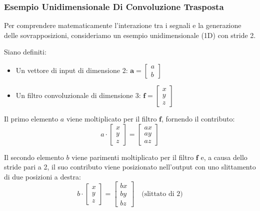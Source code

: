﻿\documentclass[11pt, a4paper]{article}
\begin{document}
\newpage

\subsubsection{Esempio Unidimensionale Di Convoluzione Trasposta}

Per comprendere matematicamente l'interazione tra i segnali e la generazione delle sovrapposizioni, consideriamo un esempio unidimensionale (1D) con stride 2.

Siano definiti:
\begin{itemize}[noitemsep]
    \item Un vettore di input di dimensione 2: $\bm{a} = \begin{bmatrix} a \\ b \end{bmatrix}$
    \item Un filtro convoluzionale di dimensione 3: $\bm{f} = \begin{bmatrix} x \\ y \\ z \end{bmatrix}$
\end{itemize}


Il primo elemento $a$ viene moltiplicato per il filtro $\bm{f}$, fornendo il contributo:
\[
a \cdot \begin{bmatrix} x \\ y \\ z \end{bmatrix} = \begin{bmatrix} ax \\ ay \\ az \end{bmatrix}
\]

Il secondo elemento $b$ viene parimenti moltiplicato per il filtro $\bm{f}$ e, a causa dello stride pari a 2, il suo contributo viene posizionato nell'output con uno slittamento di due posizioni a destra:
\[
b \cdot \begin{bmatrix} x \\ y \\ z \end{bmatrix} = \begin{bmatrix} bx \\ by \\ bz \end{bmatrix} \quad \text{(slittato di 2)}
\]
\end{document}
